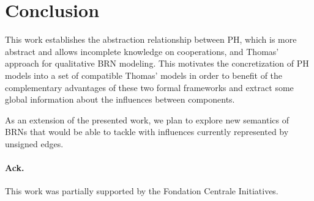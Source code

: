 \section{Conclusion}

This work establishes the abstraction relationship between PH, which is more abstract and allows incomplete knowledge on cooperations, and Thomas' approach for qualitative BRN modeling.
This motivates the concretization of PH models into a set of compatible Thomas' models in order to benefit of the complementary advantages of these two formal frameworks and extract some global information about the influences between components.

As an extension of the presented work, we plan to explore new semantics of BRNs that would be able to tackle with influences currently represented by unsigned edges.

\paragraph{Ack.}
This work was partially supported by the Fondation Centrale Initiatives.
